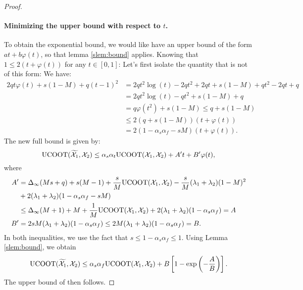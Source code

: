 \begin{proof}
    \paragraph{Minimizing the upper bound with respect to $t$.}
    To obtain the exponential bound, we would like have an upper bound of the form
    $at + b\varphi(t)$, so that lemma \ref{slem:bound} applies.
    Knowing that $1 \leq 2(t + \varphi(t))$ for any $t \in [0, 1]$:
    Let's first isolate the quantity that is not of this form:
    We have:
    \begin{equation}
      \begin{split}
        2q t \varphi(t) + s(1 - M) + q(t-1)^2 &= 2qt^2\log(t) - 2qt^2 + 2qt + s(1-M) + qt^2 -2qt + q \\
        &=  2qt^2\log(t) - qt^2 + s(1-M) + q \\
        &= q\varphi(t^2) + s(1-M) \leq q + s(1-M) \\
        &\leq 2(q + s(1-M)) (t + \varphi(t)) \\
        &= 2(1 -\alpha_s\alpha_f - sM) (t + \varphi(t)).
      \end{split}
    \end{equation}
    The new full bound is given by:
    \begin{equation}
        \text{UCOOT}(\widetilde{\mathcal X_1}, \mathcal X_2) \leq \alpha_s\alpha_t \text{UCOOT}(\mathcal X_1, \mathcal X_2) + A' t + B'\varphi(t),
    \end{equation}
    where
    \begin{equation}
        \begin{split}
            A' &= \Delta_{\infty}(Ms + q) + s(M-1) + \frac{s}{M}\text{UCOOT}(\mathcal X_1, \mathcal X_2) - \frac{s}{M}(\lambda_1 + \lambda_2)(1-M)^2 \\
            &+ 2(\lambda_1 + \lambda_2) (1-\alpha_s\alpha_f - sM) \\
            & \leq \Delta_{\infty}(M + 1) + M + \frac{1}{M}\text{UCOOT}(\mathcal X_1, \mathcal X_2) + 2(\lambda_1 + \lambda_2) (1-\alpha_s\alpha_f) = A \\
            B' &= 2sM(\lambda_1 + \lambda_2) (1-\alpha_s\alpha_f) \leq 2M(\lambda_1 + \lambda_2) (1-\alpha_s\alpha_f) = B.
        \end{split}
    \end{equation}
    In both inequalities, we use the fact that $s \leq 1 - \alpha_s \alpha_f \leq 1$.
    Using Lemma \ref{slem:bound}, we obtain
    \begin{equation}
        \text{UCOOT}(\widetilde{\mathcal X_1}, \mathcal X_2)
        \leq \alpha_s\alpha_f \text{UCOOT}(\mathcal X_1, \mathcal X_2) + B \left[ 1 - \exp{ \left(- \frac{A}{B} \right) }\right].
    \end{equation}
    The upper bound of  then follows.
  \end{proof}

